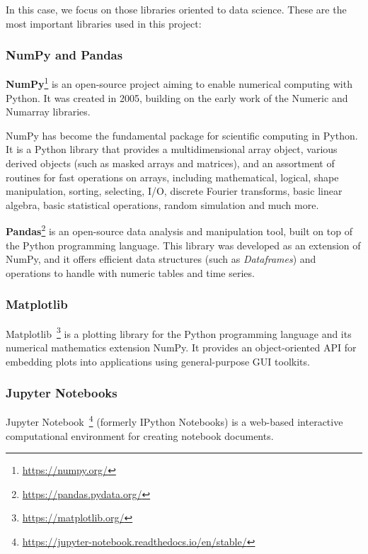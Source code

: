 \documentclass[a4paper, 12pt]{book}
\begin{document}
In this case, we focus on those libraries oriented to data science. These are the most important libraries used in this project:

\subsubsection{NumPy and Pandas}
\label{sssec:numpy-pandas}

\textbf{NumPy}\footnote{\url{https://numpy.org/}} is an open-source project aiming to enable numerical computing with Python. It was created in 2005, building on the early work of the Numeric and Numarray libraries. 

NumPy has become the fundamental package for scientific computing in Python. It is a Python library that provides a multidimensional array object, various derived objects (such as masked arrays and matrices), and an assortment of routines for fast operations on arrays, including mathematical, logical, shape manipulation, sorting, selecting, I/O, discrete Fourier transforms, basic linear algebra, basic statistical operations, random simulation and much more.

\textbf{Pandas}\footnote{\url{https://pandas.pydata.org/}} is an open-source data analysis and manipulation tool, built on top of the Python programming language. This library was developed as an extension of NumPy, and it offers efficient data structures (such as \emph{Dataframes}) and operations to handle with numeric tables and time series.

\subsubsection{Matplotlib}
\label{sssec:matplotlib}

Matplotlib~\footnote{\url{https://matplotlib.org/}} is a plotting library for the Python programming language and its numerical mathematics extension NumPy. It provides an object-oriented API for embedding plots into applications using general-purpose GUI toolkits.

\subsubsection{Jupyter Notebooks}
\label{sssec:jupyter-notebooks}

Jupyter Notebook~\footnote{\url{https://jupyter-notebook.readthedocs.io/en/stable/}} (formerly IPython Notebooks) is a web-based interactive computational environment for creating notebook documents.
\end{document}

